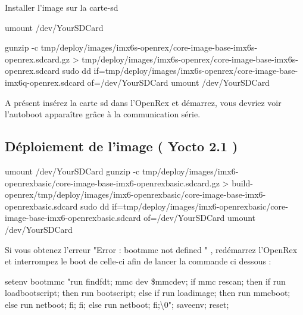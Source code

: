 Installer l’image sur la carte-sd

\begin{tcolorbox}
	umount /dev/YourSDCard

	gunzip -c tmp/deploy/images/imx6s-openrex/core-image-base-imx6s-openrex.sdcard.gz > tmp/deploy/images/imx6s-openrex/core-image-base-imx6s-openrex.sdcard
	sudo dd if=tmp/deploy/images/imx6s-openrex/core-image-base-imx6q-openrex.sdcard of=/dev/YourSDCard
	umount /dev/YourSDCard
\end{tcolorbox}

A présent insérez la carte sd dans l’OpenRex et démarrez, vous devriez voir l’autoboot apparaître grâce à la communication série.

\subsection{Déploiement de l’image ( Yocto 2.1 )}

\begin{tcolorbox}
	umount /dev/YourSDCard
	gunzip -c tmp/deploy/images/imx6-openrexbasic/core-image-base-imx6-openrexbasic.sdcard.gz > build-openrex/tmp/deploy/images/imx6-openrexbasic/core-image-base-imx6-openrexbasic.sdcard
	sudo dd if=tmp/deploy/images/imx6-openrexbasic/core-image-base-imx6-openrexbasic.sdcard of=/dev/YourSDCard
	umount /dev/YourSDCard
\end{tcolorbox}

Si vous obtenez l’erreur "Error : bootmmc not defined " , redémarrez l’OpenRex et interrompez le boot de celle-ci afin de lancer la commande ci dessous :

\begin{tcolorbox}
	setenv bootmmc "run findfdt; mmc dev \${mmcdev}; if mmc rescan; then if run loadbootscript;
	then run bootscript; else if run loadimage; then run mmcboot; else run netboot;
	fi; fi; else run netboot; fi;\textbackslash0"; saveenv; reset;
\end{tcolorbox}

